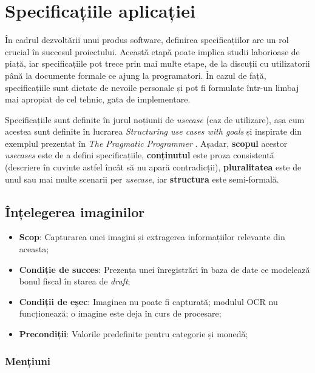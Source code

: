 \chapter{Specificațiile aplicației}\label{specs}

În cadrul dezvoltării unui produs software, definirea specificațiilor are un rol crucial în succesul proiectului. Această etapă poate implica studii laborioase de piață, iar specificațiile pot trece prin mai multe etape, de la discuții cu utilizatorii până la documente formale ce ajung la programatori. În cazul de față, specificațiile sunt dictate de nevoile personale și pot fi formulate într-un limbaj mai apropiat de cel tehnic, gata de implementare.

Specificațiile sunt definite în jurul noțiunii de \emph{usecase} (caz de utilizare), așa cum acestea sunt definite în lucrarea \emph{Structuring use cases with goals} \cite{cockburn1997structuring} și inspirate din exemplul prezentat în \emph{The Pragmatic Programmer} \cite{Hunt:2000:PPJ:320326}. Așadar, \textbf{scopul} acestor \emph{usecases} este de a defini specificațiile, \textbf{conținutul} este proza consistentă (descriere în cuvinte astfel încât să nu apară contradicții), \textbf{pluralitatea} este de unul sau mai multe scenarii per \emph{usecase}, iar \textbf{structura} este semi-formală.

\section{Înțelegerea imaginilor}\label{understanding_spec}

\begin{itemize}
\item
  \textbf{Scop}: Capturarea unei imagini și extragerea informațiilor relevante din aceasta;
\item
  \textbf{Condiție de succes}: Prezența unei înregistrări în baza de date ce modelează bonul fiscal în starea de \emph{draft};
\item
  \textbf{Condiții de eșec}: Imaginea nu poate fi capturată; modulul OCR nu funcționează; o imagine este deja în curs de procesare;
\item
  \textbf{Precondiții}: Valorile predefinite pentru categorie și monedă;
\end{itemize}

\subsection{Mențiuni}

